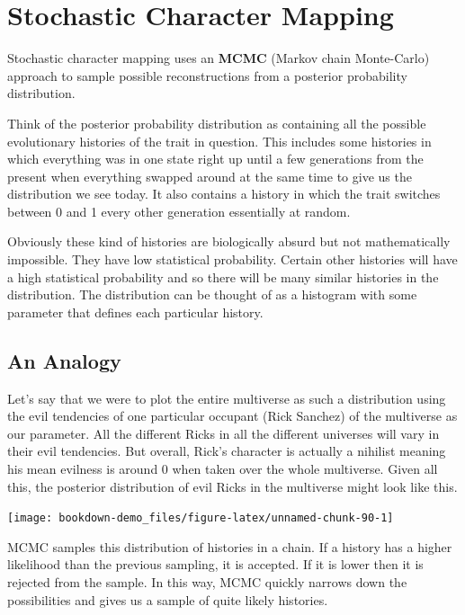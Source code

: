 \documentclass[
]{book}
\begin{document}
\hypertarget{stochastic-character-mapping}{%
\section{Stochastic Character Mapping}\label{stochastic-character-mapping}}

Stochastic character mapping uses an \textbf{MCMC} (Markov chain Monte-Carlo) approach to sample possible reconstructions from a posterior probability distribution.

Think of the posterior probability distribution as containing all the possible evolutionary histories of the trait in question. This includes some histories in which everything was in one state right up until a few generations from the present when everything swapped around at the same time to give us the distribution we see today. It also contains a history in which the trait switches between 0 and 1 every other generation essentially at random.

Obviously these kind of histories are biologically absurd but not mathematically impossible. They have low statistical probability. Certain other histories will have a high statistical probability and so there will be many similar histories in the distribution. The distribution can be thought of as a histogram with some parameter that defines each particular history.

\hypertarget{an-analogy}{%
\subsection{An Analogy}\label{an-analogy}}

Let's say that we were to plot the entire multiverse as such a distribution using the evil tendencies of one particular occupant (Rick Sanchez) of the multiverse as our parameter. All the different Ricks in all the different universes will vary in their evil tendencies. But overall, Rick's character is actually a nihilist meaning his mean evilness is around 0 when taken over the whole multiverse. Given all this, the posterior distribution of evil Ricks in the multiverse might look like this.

\begin{center}\texttt{[image: bookdown-demo\_files/figure-latex/unnamed-chunk-90-1]} \end{center}

MCMC samples this distribution of histories in a chain. If a history has a higher likelihood than the previous sampling, it is accepted. If it is lower then it is rejected from the sample. In this way, MCMC quickly narrows down the possibilities and gives us a sample of quite likely histories.
\end{document}
